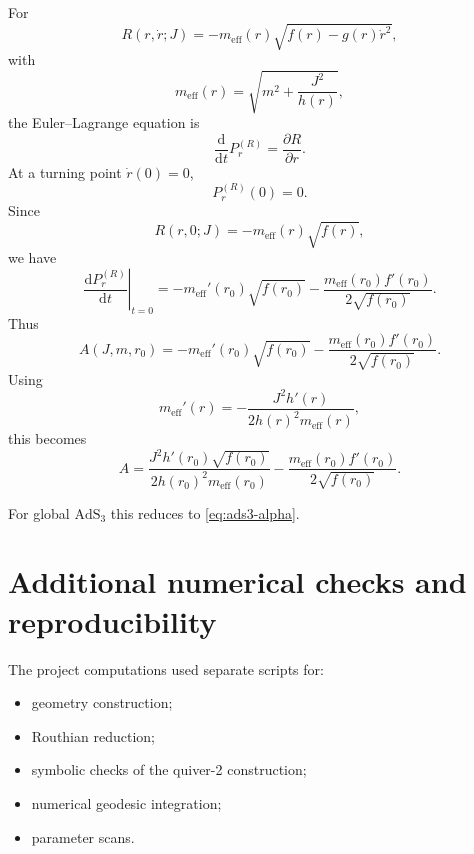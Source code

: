 \documentclass[11pt,a4paper]{article}
\theoremstyle{plain}
\theoremstyle{definition}
\theoremstyle{remark}
\newcommand{\PrR}{P_r^{(R)}}
\newcommand{\meff}{m_{\mathrm{eff}}}
\begin{document}
For
\begin{equation*}
R(r,\dot r;J)
=
-\meff(r)\sqrt{f(r)-g(r)\dot r^2},
\end{equation*}
with
\begin{equation*}
\meff(r)=\sqrt{m^2+\frac{J^2}{h(r)}},
\end{equation*}
the Euler--Lagrange equation is
\begin{equation*}
\frac{\mathrm d}{\mathrm d t}\PrR
=
\frac{\partial R}{\partial r}.
\end{equation*}
At a turning point $\dot r(0)=0$,
\begin{equation*}
\PrR(0)=0.
\end{equation*}
Since
\begin{equation*}
R(r,0;J)
=
-\meff(r)\sqrt{f(r)},
\end{equation*}
we have
\begin{equation*}
\left.\frac{\mathrm d\PrR}{\mathrm d t}\right|_{t=0}
=
-\meff'(r_0)\sqrt{f(r_0)}
-
\frac{\meff(r_0)f'(r_0)}
{2\sqrt{f(r_0)}}.
\end{equation*}
Thus
\begin{equation*}
\boxed{
A(J,m,r_0)
=
-\meff'(r_0)\sqrt{f(r_0)}
-
\frac{\meff(r_0)f'(r_0)}
{2\sqrt{f(r_0)}}.
}
\end{equation*}
Using
\begin{equation*}
\meff'(r)
=
-\frac{
J^2h'(r)
}{
2h(r)^2\meff(r)
},
\end{equation*}
this becomes
\begin{equation*}
A
=
\frac{
J^2h'(r_0)\sqrt{f(r_0)}
}{
2h(r_0)^2\meff(r_0)
}
-
\frac{
\meff(r_0)f'(r_0)
}{
2\sqrt{f(r_0)}
}.
\end{equation*}

For global $\mathrm{AdS}_3$ this reduces to \eqref{eq:ads3-alpha}.

\section{Additional numerical checks and reproducibility}
\label{app:numerics}

The project computations used separate scripts for:
\begin{itemize}[leftmargin=2em]
\item geometry construction;
\item Routhian reduction;
\item symbolic checks of the quiver-2 construction;
\item numerical geodesic integration;
\item parameter scans.
\end{itemize}
\end{document}
